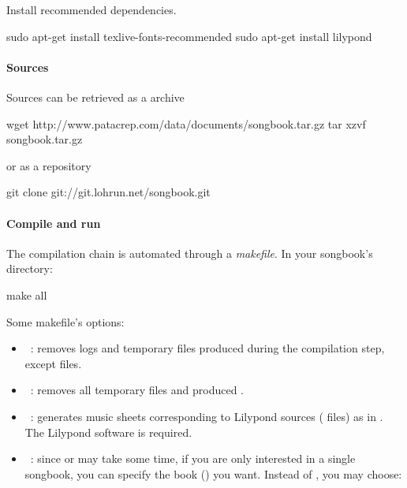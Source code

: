 Install recommended dependencies.
\begin{unix}
  sudo apt-get install texlive-fonts-recommended
  sudo apt-get install lilypond
\end{unix}

\paragraph{Sources}

Sources can be retrieved as a  archive
\begin{unix}
  wget http://www.patacrep.com/data/documents/songbook.tar.gz
  tar xzvf songbook.tar.gz
\end{unix}

or as a \git repository

\begin{unix}
  git clone git://git.lohrun.net/songbook.git
\end{unix}

\paragraph{Compile and run}

The compilation chain is automated through a \emph{makefile}. In your
songbook's directory:

\begin{unix}
  make all
\end{unix}

Some makefile's options:
\begin{itemize}
\item {}~: removes logs and temporary files
  produced during the compilation step, except  files.
\item {}~: removes all temporary files and
  produced .
\item {}~: generates music sheets
  corresponding to Lilypond sources ( files) as  in
  . The Lilypond software is required.
\item {}~: since  or
   may take some time, if you are only interested in a
  single songbook, you can specify the book () you
  want. Instead of , you may choose:
\end{itemize}

